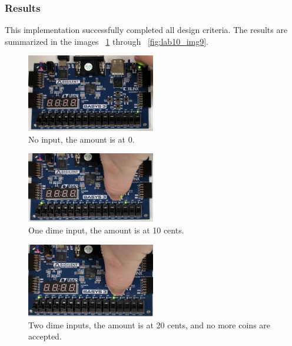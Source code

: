 \documentclass[11pt]{article}
\begin{document}
\subsubsection{Results}
This implementation successfully completed all design criteria. The results are summarized in the images ~\ref{fig:lab10_img1} through ~\ref{fig:lab10_img9}.

\begin{figure}[H]
\begin{center}
	\includegraphics[width=0.5\textwidth]{./images/lab10img1.jpg}
	\caption{\label{fig:lab10_img1}No input, the amount is at 0.}
\end{center}
\end{figure}

\begin{figure}[H]
\begin{center}
	\includegraphics[width=0.5\textwidth]{./images/lab10img2.jpg}
	\caption{\label{fig:lab10_img2}One dime input, the amount is at 10 cents.}
\end{center}
\end{figure}

\begin{figure}[H]
\begin{center}
	\includegraphics[width=0.5\textwidth]{./images/lab10img3.jpg}
	\caption{\label{fig:lab10_img3}Two dime inputs, the amount is at 20 cents, and no more coins are accepted.}
\end{center}
\end{figure}
\end{document}
